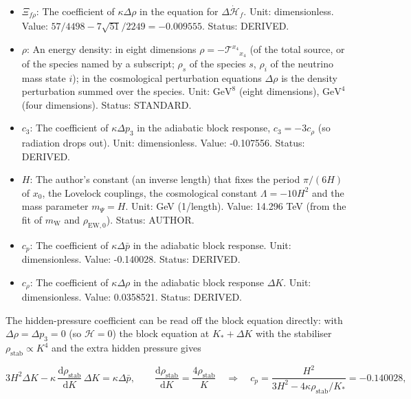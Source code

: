 \documentclass[
  10pt,
]{article}
\begin{document}
\begin{itemize}
  \(\bar p = (p_0 + 3p_5)/4\); for a species at fixed temperature
  \(\bar p = \frac14\,\partial p/\partial\ln f\). Unit:
  \(\mathrm{GeV}^{8}\) (or \(\mathrm{GeV}^{4}\) for a four-dimensional
  density). Status: DERIVED.
\item
  \(\Xi_{f\rho}\): The coefficient of \(\kappa\Delta\rho\) in the
  equation for \(\Delta\dot{\mathcal{H}}_f\). Unit: dimensionless.
  Value: \(57/4498 - 7\sqrt{51}/2249 = -0.009555\). Status: DERIVED.
\item
  \(\rho\): An energy density: in eight dimensions
  \(\rho = -\mathcal{T}^{x_4}{}_{x_4}\) (of the total source, or of the
  species named by a subscript; \(\rho_s\) of the species \(s\),
  \(\rho_i\) of the neutrino mass state \(i\)); in the cosmological
  perturbation equations \(\Delta\rho\) is the density perturbation
  summed over the species. Unit: \(\mathrm{GeV}^{8}\) (eight
  dimensions), \(\mathrm{GeV}^{4}\) (four dimensions). Status: STANDARD.
\item
  \(c_3\): The coefficient of \(\kappa\Delta p_3\) in the adiabatic
  block response, \(c_3 = -3c_\rho\) (so radiation drops out). Unit:
  dimensionless. Value: -0.107556. Status: DERIVED.
\item
  \(H\): The author's constant (an inverse length) that fixes the period
  \(\pi/(6H)\) of \(x_0\), the Lovelock couplings, the cosmological
  constant \(\Lambda = -10H^2\) and the mass parameter \(m_\Psi = H\).
  Unit: GeV (1/length). Value: 14.296 TeV (from the fit of
  \(m_{\mathrm{W}}\) and \(\rho_{\mathrm{EW},0}\)). Status: AUTHOR.
\item
  \(c_p\): The coefficient of \(\kappa\Delta\bar p\) in the adiabatic
  block response. Unit: dimensionless. Value: -0.140028. Status:
  DERIVED.
\item
  \(c_\rho\): The coefficient of \(\kappa\Delta\rho\) in the adiabatic
  block response \(\Delta K\). Unit: dimensionless. Value: 0.0358521.
  Status: DERIVED.
\end{itemize}

The hidden-pressure coefficient can be read off the block equation
directly: with \(\Delta\rho = \Delta p_3 = 0\) (so \(\mathcal{H} = 0\))
the block equation at \(K_* + \Delta K\) with the stabiliser
\(\rho_{\mathrm{stab}} \propto K^4\) and the extra hidden pressure gives

\[
3H^2\Delta K - \kappa\,\frac{\mathrm{d}\rho_{\mathrm{stab}}}{\mathrm{d}K}\,\Delta K = \kappa\Delta\bar p,\qquad
\frac{\mathrm{d}\rho_{\mathrm{stab}}}{\mathrm{d}K} = \frac{4\rho_{\mathrm{stab}}}{K}\quad\Rightarrow\quad
c_p = \frac{H^2}{3H^2 - 4\kappa\rho_{\mathrm{stab}}/K_*} = -0.140028,
\]
\end{document}
